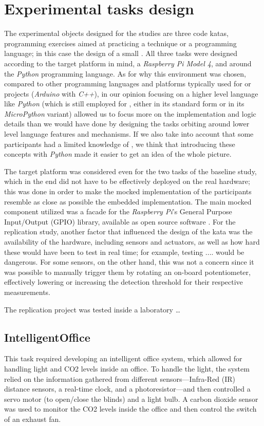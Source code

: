 \section{Experimental tasks design}
The experimental objects designed for the studies are three code katas, \ie programming exercises aimed at practicing a technique or a programming language; in this case the design of a small \es. All three tasks were designed according to the target platform in mind, a \textit{Raspberry Pi Model 4}, and around the \textit{Python} programming language. As for why this environment was chosen, compared to other programming languages and platforms typically used for \es or \iot projects (\eg \textit{Arduino} with \textit{C++}), in our opinion focusing on a higher level language like \textit{Python} (which is still employed for \ess, either in its standard form or in its \textit{MicroPython} variant) allowed us to focus more on the implementation and logic details than we would have done by designing the tasks orbiting around lower level language features and mechanisms.
If we also take into account that some participants had a limited knowledge of \ess, we think that introducing these concepts with \textit{Python} made it easier to get an idea of the whole picture.

The target platform was considered even for the two tasks of the baseline study, which in the end did not have to be effectively deployed on the real hardware; this was done in order to make the mocked implementation of the participants resemble as close as possible the embedded implementation. The main mocked component utilized was a facade for the \textit{Raspberry Pi}'s General Purpose Input/Output (GPIO) library, available as open source software \cite{GPIOMock}.
For the replication study, another factor that influenced the design of the kata was the availability of the hardware, including sensors and actuators, as well as how hard these would have been to test in real time; for example, testing .... would be dangerous.
For some sensors, on the other hand, this was not a concern since it was possible to manually trigger them by rotating an on-board potentiometer, effectively lowering or increasing the detection threshold for their respective measurements.


The replication project was tested inside a laboratory \dots


\subsection{IntelligentOffice}
This task required developing an intelligent office system, which allowed for handling light and CO2 levels inside an office. To handle the light, the system relied on the information gathered from different sensors---\ie Infra-Red (IR) distance sensors, a real-time clock, and a photoresistor---and then controlled a servo motor (to open/close the blinds) and a light bulb. A carbon dioxide sensor was used to monitor the CO2 levels inside the office and then control the switch of an exhaust fan.

